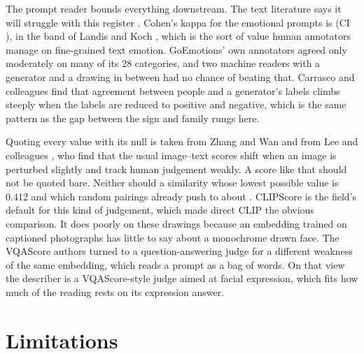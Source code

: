 The prompt reader bounds everything downstream. The text literature says it will struggle with this register \cite{demszky2020goemotions, yang2023context}. Cohen's kappa for the emotional prompts is \KappaEmo{} (CI \KappaEmoCi{}), in the \KappaEmoBand{} band of Landis and Koch \cite{landis1977measurement}, which is the sort of value human annotators manage on fine-grained text emotion. GoEmotions' own annotators agreed only moderately on many of its 28 categories, and two machine readers with a generator and a drawing in between had no chance of beating that. Carrasco and colleagues \cite{carrasco2024level} find that agreement between people and a generator's labels climbs steeply when the labels are reduced to positive and negative, which is the same pattern as the gap between the sign and family rungs here.

Quoting every value with its null is taken from Zhang and Wan \cite{zhang2025rethinking} and from Lee and colleagues \cite{lee2023holistic}, who find that the usual image--text scores shift when an image is perturbed slightly and track human judgement weakly. A score like that should not be quoted bare. Neither should a similarity whose lowest possible value is 0.412 and which random pairings already push to about \FullNeuVaNull{}. CLIPScore \cite{hessel2021clipscore} is the field's default for this kind of judgement, which made direct CLIP the obvious comparison. It does poorly on these drawings because an embedding trained on captioned photographs has little to say about a monochrome drawn face. The VQAScore authors \cite{lin2024evaluating} turned to a question-answering judge for a different weakness of the same embedding, which reads a prompt as a bag of words. On that view the describer is a VQAScore-style judge aimed at facial expression, which fits how much of the reading rests on its expression answer.

\section{Limitations}
\label{sec:disc-limitations}

